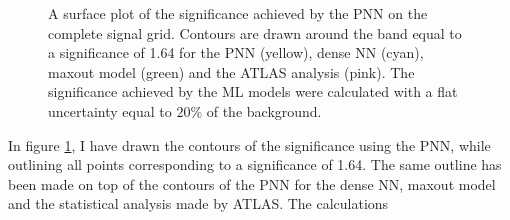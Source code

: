 \begin{figure}
    \caption[A surface plot of the significance comparing sensitivity limits set by \acs{PNN}, dense \acs{NN}, maxout model
    and the \acs{ATLAS} analysis, where the models have assumed a flat uncertainty of $20\%$.]{A surface plot of the significance achieved 
    by the \acs{PNN} on the complete signal grid. Contours are drawn around the band equal to a significance of 1.64 for the \acs{PNN} 
    (yellow), dense \acs{NN} (cyan), maxout model (green) and the \acs{ATLAS} analysis \cite{atlas_search_2021} (pink). The significance achieved 
    by the \acs{ML} models were calculated with a flat uncertainty equal to $20\%$ of the background.}
    \label{fig:compLimit20}
\end{figure}
In figure \ref{fig:compLimit20}, I have drawn the contours of the significance using the \ac{PNN},
while outlining all points corresponding to a significance of 1.64. The same outline has been made on top of the 
contours of the \ac{PNN} for the dense \ac{NN}, maxout model and the statistical analysis made by \ac{ATLAS}. The calculations
